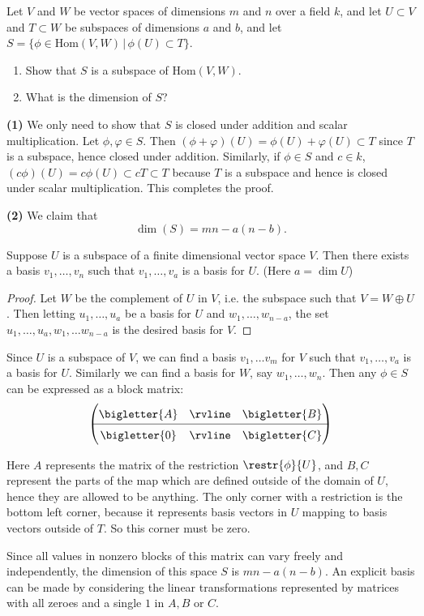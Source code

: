 \begin{problem}
  Let $V$ and $W$ be vector spaces of dimensions $m$ and $n$ over a field $k$, and let $U \subset V$ and $T \subset W$ be subspaces of dimensions $a$ and $b$, and let $S = \{ \phi\in \mathrm{Hom}(V,W)\,|\, \phi(U) \subset T \}$.
  \begin{enumerate}
    \item Show that $S$ is a subspace of $\mathrm{Hom}(V,W)$.
    \item What is the dimension of $S$?
  \end{enumerate}
\end{problem}

\textbf{(1)} We only need to show that $S$ is closed under addition and scalar multiplication. Let $\phi, \varphi\in S$. Then $(\phi+\varphi)(U)=\phi(U)+\varphi(U)\subset T$ since $T$ is a subspace, hence closed under addition. Similarly, if $\phi\in S$ and $c\in k$, $(c\phi)(U)=c\phi(U)\subset cT\subset T$ because $T$ is a subspace and hence is closed under scalar multiplication. This completes the proof.      

\textbf{(2)} We claim that
\[
  \dim(S)=mn-a(n-b)  
.\] 
\begin{lemma}
  Suppose $U$ is a subspace of a finite dimensional vector space $V$. Then there exists a basis $v_1,\ldots,v_n$ such that $v_1,\ldots, v_a$ is a basis for $U$. (Here $a= \dim U$)    
\end{lemma}
\begin{proof}
  Let $W$ be the complement of $U$ in $V$, i.e. the subspace such that $V=W\oplus U$. Then letting $u_1,\ldots , u_a$ be a basis for $U$ and $w_1,\ldots , w_{n-a}$, the set $u_1,\ldots ,u_a, w_1,\ldots w_{n-a}$ is the desired basis for $V$.       
\end{proof}

Since $U$ is a subspace of $V$, we can find a basis $v_1,\ldots v_m$ for $V$ such that $v_1,\ldots,v_a$ is a basis for $U$. Similarly we can find a basis for $W$, say $w_1,\ldots, w_n$. Then any $\phi\in S$ can be expressed as a block matrix:
\[
\begingroup
\renewcommand*{\arraystretch}{1.5}
\begin{pmatrix}
  \bigletter{A}
  & \rvline & \bigletter{B} \\
\hline
  \bigletter{0} & \rvline &
  \bigletter{C}
\end{pmatrix}
\endgroup
\]

Here $A$ represents the matrix of the restriction $\restr{\phi}{U}$, and $B,C$ represent the parts of the map which are defined outside of the domain of $U$, hence they are allowed to be anything. The only corner with a restriction is the bottom left corner, because it represents basis vectors in $U$ mapping to basis vectors outside of $T$. So this corner must be zero.

Since all values in nonzero blocks of this matrix can vary freely and independently, the dimension of this space $S$ is $mn-a(n-b)$. An explicit basis can be made by considering the linear transformations represented by matrices with all zeroes and a single $1$ in $A,B$ or $C$.